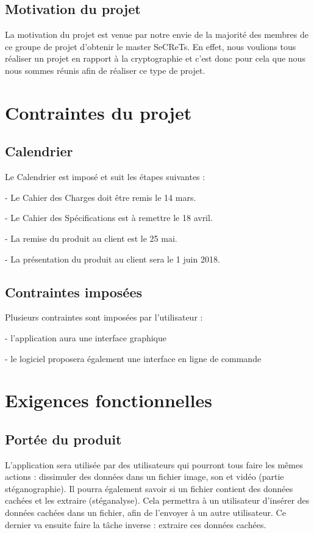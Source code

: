 \documentclass[11pt]{article}
\begin{document}
\subsection{Motivation du projet}

La motivation du projet est venue par notre envie de la majorité des membres de ce groupe de projet d'obtenir le master SeCReTs. 
En effet, nous voulions tous réaliser un projet en rapport à la cryptographie et c'est donc pour cela que nous nous sommes réunis afin de réaliser ce type de projet. 

\section{Contraintes du projet}

\subsection{Calendrier}

Le Calendrier est imposé et suit les étapes suivantes : 

- Le Cahier des Charges doit être remis le 14 mars. 

- Le Cahier des Spécifications est à remettre le 18 avril. 

- La remise du produit au client est le 25 mai. 

- La présentation du produit au client sera le 1 juin 2018.  


\subsection{Contraintes imposées} %
Plusieurs contraintes sont imposées par l'utilisateur : 
 
- l'application aura une interface graphique 

- le logiciel proposera également une interface en ligne de commande


\section{Exigences fonctionnelles}
\subsection{Portée du produit}
L'application sera utilisée par des utilisateurs qui pourront tous faire les mêmes actions : dissimuler des données dans un fichier image, son et vidéo (partie stéganographie). 
Il pourra également savoir si un fichier contient des données cachées et les extraire (stéganalyse). 
Cela permettra à un utilisateur d'insérer des données cachées dans un fichier, afin de l'envoyer à un autre utilisateur. Ce dernier va ensuite faire la tâche inverse : extraire ces données cachées. 
\end{document}
